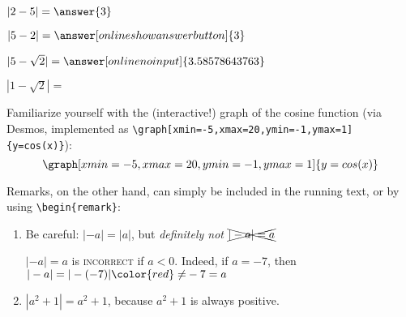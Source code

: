 \documentclass{ximera}
\begin{document}
\begin{exercise}\nl 

    \begin{xmmulticols}
    \begin{question} $|2-5| = \answer{3}$ \end{question}
    \begin{question} $|5-2| = \answer[onlineshowanswerbutton]{3}$ \end{question}
    \begin{question} $|5-\sqrt{2}| = \answer[onlinenoinput]{3.58578643763}$ \end{question}
    \begin{question} 
        $|1-\sqrt{2}| = $
    \end{question}
    \end{xmmulticols}
\end{exercise}

Familiarize yourself with the (interactive!) graph of the cosine function 
(via Desmos, implemented as \verb|\graph[xmin=-5,xmax=20,ymin=-1,ymax=1]{y=cos(x)}|):
\[  
\graph[xmin=-5,xmax=20,ymin=-1,ymax=1]{y=cos(x)}  
\] 

Remarks, on the other hand, can simply be included in the running text, or by using \verb|\begin{remark}|:

\begin{remark} \nl
		\begin{enumerate}
			\item Be careful: $|-a|= |a|$, but \textit{definitely not} $\xcancel{|-a|=a}$

			$|-a|=a$ is \textsc{incorrect} if $a<0$. Indeed, if $a=-7$, then $|-a| = |-(-7)| {\color{red}\neq} -7 = a$
			\item $|a^2 + 1| = a^2 + 1$, because $a^2+1$ is always positive.
\end{enumerate}
\end{remark}
\end{document}
